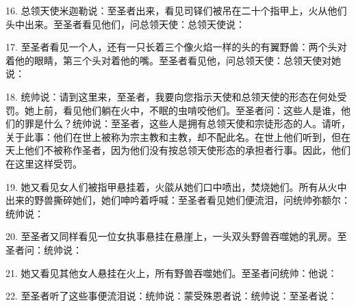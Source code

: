 16. 总领天使米迦勒说：至圣者出来，看见司铎们被吊在二十个指甲上，火从他们头中出来。至圣者看见他们，问总领天使：总领天使说：\par

17. 至圣者看见一个人，还有一只长着三个像火焰一样的头的有翼野兽：两个头对着他的眼睛，第三个头对着他的嘴。至圣者看见他，问总领天使：总领天使对她说：\par

18. 统帅说：请到这里来，至圣者，我要向您指示天使和总领天使的形态在何处受罚。她上前，看见他们躺在火中，不眠的虫啃咬他们。至圣者问：这些人是谁，他们的罪是什么？统帅说：至圣者，这些人是拥有总领天使和宗徒形态的人。请听，关于此事：他们在世上被称为宗主教和主教，却不配此名。在世上他们听到，但在天上他们不被称作圣者，因为他们没有按总领天使形态的承担者行事。因此，他们在这里这样受罚。\par

19. 她又看见女人们被指甲悬挂着，火燄从她们口中喷出，焚烧她们。所有从火中出来的野兽撕碎她们，她们呻吟着呼喊：至圣者看见她们便流泪，问统帅弥额尔：统帅说：\par

20. 至圣者又同样看见一位女执事悬挂在悬崖上，一头双头野兽吞噬她的乳房。至圣者问：统帅说：\par

21. 她又看见其他女人悬挂在火上，所有野兽吞噬她们。至圣者问统帅：他说：\par

22. 至圣者听了这些事便流泪说：统帅说：蒙受殊恩者说：统帅说：至圣者说：\par

